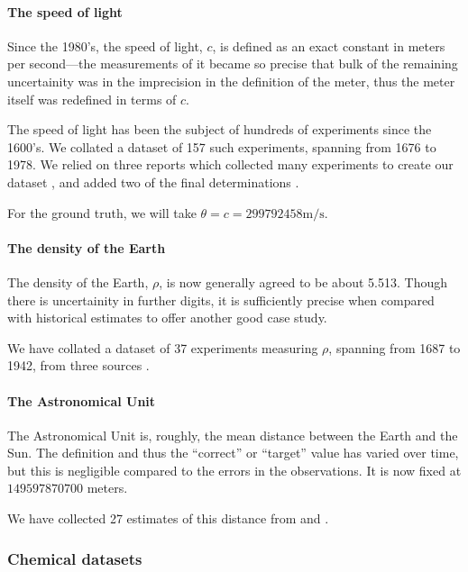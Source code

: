 \documentclass[12pt]{article}
\begin{document}
\paragraph{The speed of light}

Since the 1980's, the speed of light, $c$, is defined as an exact constant in meters per second---the measurements of it became so precise that bulk of the remaining uncertainity was in the imprecision in the definition of the meter, thus the meter itself was redefined in terms of $c$.

The speed of light has been the subject of hundreds of experiments since the 1600's. We collated a dataset of 157 such experiments, spanning from 1676 to 1978. We relied on three reports which collected many experiments to create our dataset \citep{birge1934velocity,froome1971velocity,raynaud2013determining}, and added two of the final determinations \citep{evenson1972speed,blaney1974measurement}.

For the ground truth, we will take $\theta=c=299792458\mathrm{m}/\mathrm{s}$.

\paragraph{The density of the Earth}

The density of the Earth, $\rho$, is now generally agreed to be about 5.513. Though there is uncertainity in further digits, it is sufficiently precise when compared with historical estimates to offer another good case study.

We have collated a dataset of 37 experiments measuring $\rho$, spanning from 1687 to 1942, from three sources \citep{burgess1902value,sagitov1970current,hughes2006mean}.

\paragraph{The Astronomical Unit}

The Astronomical Unit is, roughly, the mean distance between the Earth and the Sun. The definition and thus the ``correct'' or ``target'' value has varied over time, but this is negligible compared to the errors in the observations. It is now fixed at $149597870700$ meters.

We have collected 27 estimates of this distance from \citet{atkins1964determination} and \citet{standish2004astronomical}.

\subsubsection{Chemical datasets}
\end{document}
